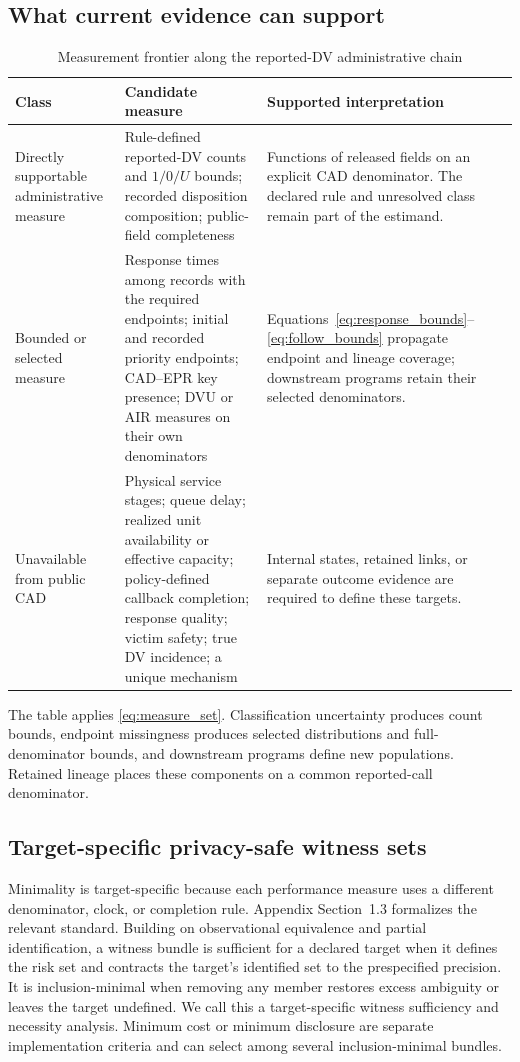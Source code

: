 \documentclass[11pt]{article}
\begin{document}
\subsection{What current evidence can support}

\begin{table}[H]
\centering
\caption{Measurement frontier along the reported-DV administrative chain}
\label{tab:dv_admissibility}
\begin{tabularx}{\textwidth}{@{}>{\raggedright\arraybackslash}p{2.45cm} X X@{}}
\toprule
Class & Candidate measure & Supported interpretation \\
\midrule
Directly supportable administrative measure &
Rule-defined reported-DV counts and $1/0/U$ bounds; recorded disposition composition; public-field completeness &
Functions of released fields on an explicit CAD denominator. The declared rule and unresolved class remain part of the estimand. \\
\addlinespace
Bounded or selected measure &
Response times among records with the required endpoints; initial and recorded priority endpoints; CAD--EPR key presence; DVU or AIR measures on their own denominators &
Equations~\ref{eq:response_bounds}--\ref{eq:follow_bounds} propagate endpoint and lineage coverage; downstream programs retain their selected denominators. \\
\addlinespace
Unavailable from public CAD &
Physical service stages; queue delay; realized unit availability or effective capacity; policy-defined callback completion; response quality; victim safety; true DV incidence; a unique mechanism &
Internal states, retained links, or separate outcome evidence are required to define these targets. \\
\bottomrule
\end{tabularx}
\end{table}

The table applies \cref{eq:measure_set}. Classification uncertainty produces count bounds, endpoint missingness produces selected distributions and full-denominator bounds, and downstream programs define new populations. Retained lineage places these components on a common reported-call denominator.

\subsection{Target-specific privacy-safe witness sets}

Minimality is target-specific because each performance measure uses a different denominator, clock, or completion rule. Appendix Section~1.3 formalizes the relevant standard. Building on observational equivalence and partial identification, a witness bundle is sufficient for a declared target when it defines the risk set and contracts the target's identified set to the prespecified precision. It is inclusion-minimal when removing any member restores excess ambiguity or leaves the target undefined. We call this a target-specific witness sufficiency and necessity analysis. Minimum cost or minimum disclosure are separate implementation criteria and can select among several inclusion-minimal bundles.
\end{document}
